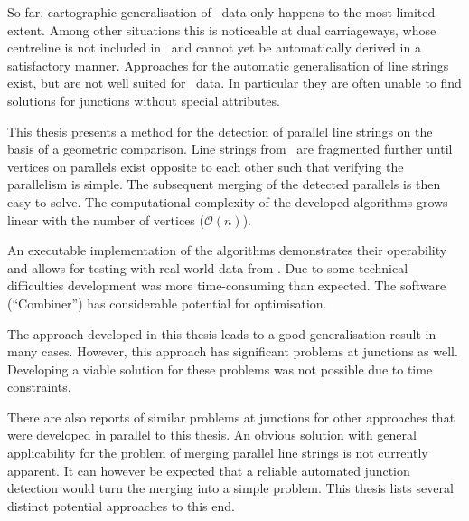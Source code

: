 \documentclass[../main/thesis.tex]{subfiles}
\begin{document}
So far, cartographic generalisation of \osm\ data only happens to the most limited extent.
Among other situations this is noticeable at dual carriageways, whose centreline is not included in \osm\ and cannot yet be automatically derived in a satisfactory manner.
Approaches for the automatic generalisation of line strings exist, but are not well suited for \osm\ data.
In particular they are often unable to find solutions for junctions without special attributes.

This thesis presents a method for the detection of parallel line strings on the basis of a geometric comparison.
Line strings from \osm\ are fragmented further until vertices on parallels exist opposite to each other such that verifying the parallelism is simple.
The subsequent merging of the detected parallels is then easy to solve.
The computational complexity of the developed algorithms grows linear with the number of vertices ($\mathcal{O}(n)$).

An executable implementation of the algorithms demonstrates their operability and allows for testing with real world data from \osm.
Due to some technical difficulties development was more time-consuming than expected.
The software (“Combiner”) has considerable potential for optimisation.

The approach developed in this thesis leads to a good generalisation result in many cases.
However, this approach has significant problems at junctions as well.
Developing a viable solution for these problems was not possible due to time constraints.

There are also reports of similar problems at junctions for other approaches that were developed in parallel to this thesis.
An obvious solution with general applicability for the problem of merging parallel line strings is not currently apparent.
It can however be expected that a reliable automated junction detection would turn the merging into a simple problem.
This thesis lists several distinct potential approaches to this end.
\end{document}
